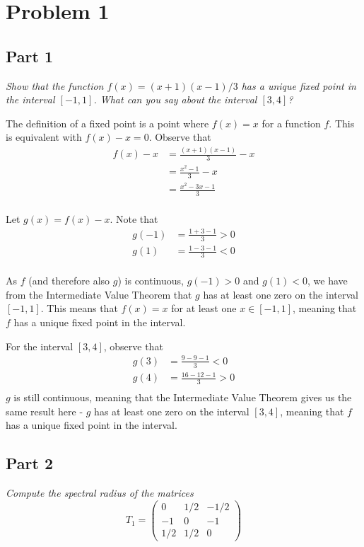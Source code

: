 \section{Problem 1}

\subsection{Part 1}
\textit{Show that the function $f(x) = (x+1)(x-1) / 3$ has a unique fixed point in the interval $[-1, 1]$. What can you say about the interval $[3, 4]$?}

The definition of a fixed point is a point where $f(x) = x$ for a function $f$. This is equivalent with $f(x) - x = 0$. Observe that
\begin{align*}
    f(x) - x &= \frac{(x+1)(x-1)}{3} - x \\
            &= \frac{x^2 - 1}{3} - x \\
            &= \frac{x^2 - 3x - 1}{3} \\
\end{align*}

Let $g(x) = f(x) - x$. Note that
\begin{align*}
    g(-1) &= \frac{1 + 3 - 1}{3} > 0 \\
    g(1)  &= \frac{1 - 3 - 1}{3} < 0 \\
\end{align*}

As $f$ (and therefore also $g$) is continuous, $g(-1) > 0$ and $g(1) < 0$, we have from the Intermediate Value Theorem that $g$ has at least one zero on the interval $[-1, 1]$. This means that $f(x) = x$ for at least one $x \in [-1, 1]$, meaning that $f$ has a unique fixed point in the interval.


For the interval $[3, 4]$, observe that 
\begin{align*}
    g(3) &= \frac{9 - 9 - 1}{3} < 0 \\
    g(4) &= \frac{16 - 12 - 1}{3} > 0 \\
\end{align*}
$g$ is still continuous, meaning that the Intermediate Value Theorem gives us the same result here - $g$ has at least one zero on the interval $[3, 4]$, meaning that $f$ has a unique fixed point in the interval.



\subsection{Part 2}
\textit{Compute the spectral radius of the matrices}
\begin{equation*}
    T_1 = 
    \begin{pmatrix}
        0 & 1/2 & -1/2 \\
        -1 & 0 & -1 \\
        1/2 & 1/2 & 0
    \end{pmatrix}
\end{equation*}

